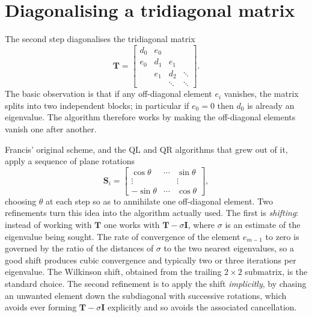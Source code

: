 \section{Diagonalising a tridiagonal matrix}
\label{sec:qlalgorithm}

The second step diagonalises the tridiagonal matrix
\begin{equation}
  \bm{T} =
  \begin{bmatrix}
    d_0 & e_0 &     &     \\
    e_0 & d_1 & e_1 &     \\
        & e_1 & d_2 & \ddots\\
        &     & \ddots & \ddots
  \end{bmatrix}.
  \label{eq:1-tridiagmat}
\end{equation}
The basic observation is that if any off-diagonal element $e_i$ vanishes, the
matrix splits into two independent blocks; in particular if $e_0=0$ then $d_0$
is already an eigenvalue.  The algorithm therefore works by making the
off-diagonal elements vanish one after another.

Francis' original scheme, and the QL and QR algorithms that grew out of it,
apply a sequence of plane rotations
\begin{equation}
  \bm{S}_i =
  \begin{bmatrix}
    \cos\theta & \cdots & \sin\theta\\
    \vdots & & \vdots\\
    -\sin\theta & \cdots & \cos\theta
  \end{bmatrix},
  \label{eq:1-planerot}
\end{equation}
choosing $\theta$ at each step so as to annihilate one off-diagonal element.
Two refinements turn this idea into the algorithm actually used.  The first is
\emph{shifting}: instead of working with $\bm{T}$ one works with
$\bm{T}-\sigma\bm{I}$, where $\sigma$ is an estimate of the eigenvalue being
sought.  The rate of convergence of the element $e_{m-1}$ to zero is governed
by the ratio of the distances of $\sigma$ to the two nearest eigenvalues, so a
good shift produces cubic convergence and typically two or three iterations
per eigenvalue.  The Wilkinson shift, obtained from the trailing $2\times2$
submatrix, is the standard choice.  The second refinement is to apply the
shift \emph{implicitly}, by chasing an unwanted element down the subdiagonal
with successive rotations, which avoids ever forming
$\bm{T}-\sigma\bm{I}$ explicitly and so avoids the associated cancellation.

